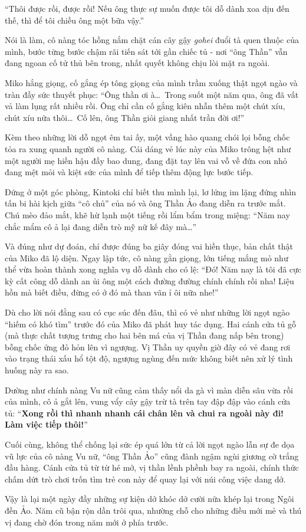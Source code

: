 \documentclass[../main.tex]{subfiles}
\begin{document}
``Thôi được rồi, được rồi! Nếu ông thực sự muốn được tôi dỗ dành xoa dịu đến thế, thì để tôi chiều ông một bữa vậy.''

\ct

Nói là làm, cô nàng tóc hồng nắm chặt cán cây gậy \textit{gohei} đuổi tà quen thuộc của mình, bước từng bước chậm rãi tiến sát tới gần chiếc tủ - nơi ``ông Thần'' vẫn đang ngoan cố tử thủ bên trong, nhất quyết không chịu lòi mặt ra ngoài.


Miko hắng giọng, cố gắng ép tông giọng của mình trầm xuống thật ngọt ngào và tràn đầy sức thuyết phục: ``Ông thần ơi à\dots\ Trong suốt một năm qua, ông đã vất vả làm lụng rất nhiều rồi. Ông chỉ cần cố gắng kiên nhẫn thêm một chút xíu, chút xíu nữa thôi\dots\ Cố lên, ông Thần giỏi giang nhất trần đời ơi!''

Kèm theo những lời dỗ ngọt êm tai ấy, một vầng hào quang chói lọi bỗng chốc tỏa ra xung quanh người cô nàng. Cái dáng vẻ lúc này của Miko trông hệt như một người mẹ hiền hậu đầy bao dung, đang đặt tay lên vai vỗ về đứa con nhỏ đang mệt mỏi và kiệt sức của mình để tiếp thêm động lực bước tiếp.

Đứng ở một góc phòng, Kintoki chỉ biết thu mình lại, lơ lửng im lặng đứng nhìn tấn bi hài kịch giữa ``cô chủ'' của nó và ông Thần Ảo đang diễn ra trước mắt. Chú mèo đảo mắt, khẽ hừ lạnh một tiếng rồi lẩm bẩm trong miệng: ``Năm nay chắc mẩm cô ả lại đang diễn trò mỹ nữ kế đây mà\dots''


Và đúng như dự đoán, chỉ được đúng ba giây đóng vai hiền thục, bản chất thật của Miko đã lộ diện. Ngay lập tức, cô nàng gằn giọng, lớn tiếng mắng mỏ như thể vừa hoàn thành xong nghĩa vụ dỗ dành cho có lệ: ``Đó! Năm nay là tôi đã cực kỳ cất công dỗ dành an ủi ông một cách đường đường chính chính rồi nha! Liệu hồn mà biết điều, đừng có ở đó mà than vãn ỉ ôi nữa nhe!''

Dù cho lời nói đằng sau có cục súc đến đâu, thì có vẻ như những lời ngọt ngào ``hiếm có khó tìm'' trước đó của Miko đã phát huy tác dụng. Hai cánh cửa tủ gỗ (mà thực chất tượng trưng cho hai bên má của vị Thần đang nấp bên trong) bỗng chốc ửng đỏ hỏn lên vì ngượng. Vị Thần uy quyền giờ đây có vẻ đang rơi vào trạng thái xấu hổ tột độ, ngượng ngùng đến mức không biết nên xử lý tình huống này ra sao.

Dường như chính nàng Vu nữ cũng cảm thấy nổi da gà vì màn diễn sâu vừa rồi của mình, cô ả gắt lên, vung vẩy cây gậy trừ tà trên tay đập đập vào cánh cửa tủ: ``\textbf{Xong rồi thì nhanh nhanh cái chân lên và chui ra ngoài này đi! Làm việc tiếp thôi!}''


Cuối cùng, không thể chống lại sức ép quá lớn từ cả lời ngọt ngào lẫn sự đe dọa vũ lực của cô nàng Vu nữ, ``ông Thần Ảo'' cũng đành ngậm ngùi giương cờ trắng đầu hàng. Cánh cửa tủ từ từ hé mở, vị thần lềnh phềnh bay ra ngoài, chính thức chấm dứt trò chơi trốn tìm trẻ con này để quay lại với núi công việc dang dở.

Vậy là lại một ngày đầy những sự kiện dở khóc dở cười nữa khép lại trong Ngôi đền Ảo. Năm cũ bận rộn dần trôi qua, nhường chỗ cho những điều mới mẻ và thú vị đang chờ đón trong năm mới ở phía trước.
\end{document}
